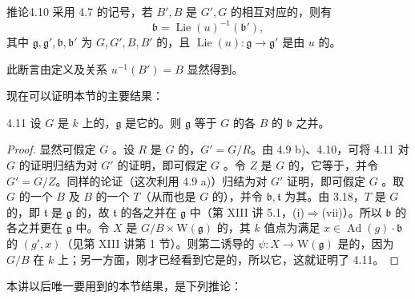 \begin{SGAresult}{推论}{4.10}
采用 4.7 的记号，若 $B',B$ 是 $G',G$ 的相互对应的，则有
\[\mathfrak b=\operatorname{Lie}(u)^{-1}(\mathfrak b'),\]
其中 $\mathfrak g,\mathfrak g',\mathfrak b,\mathfrak b'$ 为 $G,G',B,B'$ 的，且 $\operatorname{Lie}(u):\mathfrak g\to\mathfrak g'$ 是由 $u$ 的。
\end{SGAresult}
此断言由定义及关系 $u^{-1}(B')=B$ 显然得到。

现在可以证明本节的主要结果：
\begin{SGAresult}{}{4.11}
设 $G$ 是 $k$ 上的，$\mathfrak g$ 是它的。则 $\mathfrak g$ 等于 $G$ 的各 $B$ 的 $\mathfrak b$ 之并。
\end{SGAresult}
\begin{proof}
显然可假定 $G$ 。设 $R$ 是 $G$ 的，$G'=G/R$。由 4.9 b)、4.10，可将 4.11 对 $G$ 的证明归结为对 $G'$ 的证明，即可假定 $G$ 。令 $Z$ 是 $G$ 的，它等于，并令 $G'=G/Z$。同样的论证（这次利用 4.9 a)）归结为对 $G'$ 证明，即可假定 $G$ 。取 $G$ 的一个 $B$ 及 $B$ 的一个 $T$（从而也是 $G$ 的），并令 $\mathfrak b,\mathfrak t$ 为其。由 3.18，$T$ 是 $G$ 的，即 $\mathfrak t$ 是 $\mathfrak g$ 的，故 $\mathfrak t$ 的各之并在 $\mathfrak g$ 中（第 XIII 讲 5.1，(i)$\Rightarrow$(vii)）。所以 $\mathfrak b$ 的各之并更在 $\mathfrak g$ 中。令 $X$ 是 $G/B\times\mathrm W(\mathfrak g)$ 的，其 $k$ 值点为满足 $x\in\operatorname{Ad}(g)\cdot\mathfrak b$ 的 $(g',x)$（见第 XIII 讲第 1 节）。则第二诱导的 $\psi:X\to\mathrm W(\mathfrak g)$ 是的，因为 $G/B$ 在 $k$ 上；另一方面，刚才已经看到它是的，所以它，这就证明了 4.11。
\end{proof}
本讲以后唯一要用到的本节结果，是下列推论：
